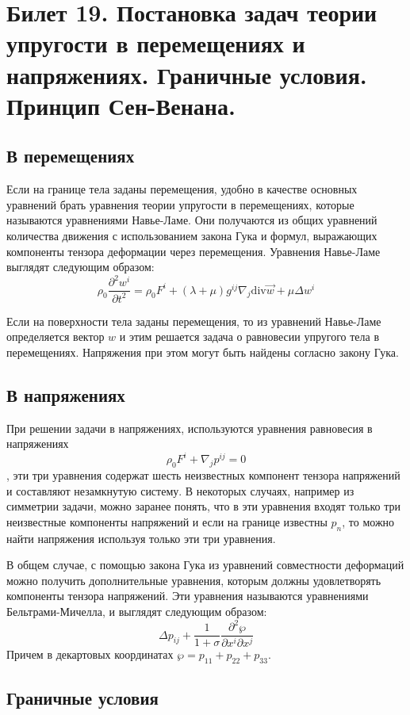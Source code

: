 \newpage
\section{Билет 19. Постановка задач теории упругости в перемещениях и напряжениях. Граничные условия. Принцип Сен-Венана.}

\subsection{В перемещениях}
Если на границе тела заданы перемещения, удобно в качестве основных уравнений брать уравнения теории упругости в перемещениях, которые называются уравнениями Навье-Ламе. Они получаются из общих уравнений количества движения с использованием закона Гука и формул, выражающих компоненты тензора деформации через перемещения. Уравнения Навье-Ламе выглядят следующим образом:
$$
\rho_0\frac{\partial^2 w^i}{\partial t^2} = \rho_0 F^i + (\lambda + \mu)g^{ij}\nabla_j \mathrm{div} \vec{w} + \mu \Delta w^i
$$

Если на поверхности тела заданы перемещения, то из уравнений Навье-Ламе определяется вектор $w$ и этим решается задача о равновесии упругого тела в перемещениях. Напряжения при этом могут быть найдены согласно закону Гука. 

\subsection{В напряжениях}

При решении задачи в напряжениях, используются уравнения равновесия в напряжениях  $$\rho_0 F^i + \nabla_j p^{ij} = 0$$, эти три уравнения содержат шесть неизвестных компонент тензора напряжений и составляют незамкнутую систему. В некоторых случаях, например из симметрии задачи, можно заранее понять, что в эти уравнения входят только три неизвестные компоненты напряжений и если на границе известны $p_n$, то можно найти напряжения используя только эти три уравнения.

В общем случае, с помощью закона Гука из уравнений совместности деформаций можно получить дополнительные уравнения, которым должны удовлетворять компоненты тензора напряжений. Эти уравнения называются уравнениями Бельтрами-Мичелла, и выглядят следующим образом:
$$
\Delta p_{ij} + \frac{1}{1+\sigma} \frac{\partial^2 \wp}{\partial x^i \partial x^j}
$$
Причем в декартовых координатах $\wp = p_{11} + p_{22} + p_{33}$.

\newpage
\subsection{Граничные условия}

